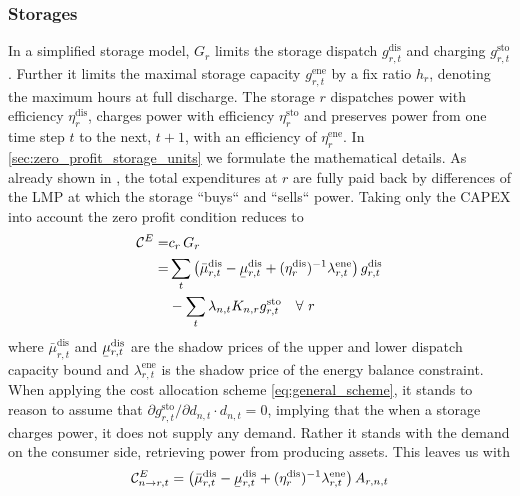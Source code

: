 \documentclass[11pt,twocolumn]{article}
\newcommand{\ubar}[1]{\underaccent{\bar}{#1}}
\newcommand{\Forall}[1]{\hspace{10pt} \forall \,\, #1 }
\newcommand{\storage}{g_{r,t}}
\newcommand{\storagedispatch}{\storage^\text{dis}}
\newcommand{\storagecharge}{\storage^\text{sto}}
\newcommand{\storagesoc}{\storage^\text{ene}}
\newcommand{\efficiency}{\eta_{r}}
\newcommand{\efficiencydispatch}{\efficiency^\text{dis}}
\newcommand{\efficiencycharge}{\efficiency^\text{sto}}
\newcommand{\efficiencysoc}{\efficiency^\text{ene}}
\newcommand{\capitalpricestorage}{c_r}
\newcommand{\capacitystorage}{G_r}
\newcommand{\mulowerstoragedispatch}{\ubar{\mu}_{r,t}^\text{dis}}
\newcommand{\muupperstoragedispatch}{\bar{\mu}_{r,t}^\text{dis}}
\newcommand{\muupperstoragecharge}{\bar{\mu}_{r,t}^\text{sto}}
\newcommand{\muupperstoragesoc}{\bar{\mu}_{r,t}^\text{ene}}
\newcommand{\mustateofcharge}{\lambda^\text{ene}_{r,t}}
\newcommand{\lmp}[1][n]{\lambda_{#1,t}}
\newcommand{\demand}[1][n]{d_{#1,t}}
\newcommand{\incidencestorage}[1][n]{K_{#1,r}}
\newcommand{\capexstorage}{\mathcal{C}^E}
\newcommand{\allocatestoragedispatch}[1][r, n]{A_{#1,t}}
\newcommand{\allocatecapexstorage}[1][n \rightarrow r]{\capexstorage_{#1,t}}
\begin{document}
\subsubsection{Storages}


In a simplified storage model, $\capacitystorage$ limits the storage dispatch $\storagedispatch$ and charging $\storagecharge$. Further it limits the maximal storage capacity $\storagesoc$ by a fix ratio $h_r$, denoting the maximum hours at full discharge. The storage $r$ dispatches power with efficiency $\efficiencydispatch$, charges power with efficiency $\efficiencycharge$ and preserves power from one time step $t$ to the next, $t+1$, with an efficiency of $\efficiencysoc$. In \cref{sec:zero_profit_storage_units} we formulate the mathematical details. As already shown in \cite{brown_decreasing_2020}, the total expenditures at $r$ are fully paid back by differences of the LMP at which the storage ``buys`` and ``sells`` power. Taking only the CAPEX into account the zero profit condition reduces to
\begin{align}
    \notag
    \capexstorage =& \capitalpricestorage \, \capacitystorage \\
    \notag
    =& \sum_t \left(\muupperstoragedispatch - \mulowerstoragedispatch  + (\efficiencydispatch )^{-1} \mustateofcharge \right) \storagedispatch \\
    &- \sum_t \lmp \incidencestorage  \storagecharge \Forall{r} 
    \label{eq:no_profit_capex_storage}
\end{align}
where $\muupperstoragedispatch$ and $\mulowerstoragedispatch$ are the shadow prices of the upper and lower dispatch capacity bound and $\mustateofcharge$ is the shadow price of the energy balance constraint. When applying the cost allocation scheme \cref{eq:general_scheme}, it stands to reason to assume that $\partial \storagecharge / \partial \demand \cdot \demand = 0$, implying that the when a storage charges power, it does not supply any demand. Rather it stands with the demand on the consumer side, retrieving power from producing assets. 
This leaves us with 
\begin{align}
     \allocatecapexstorage = \left(\muupperstoragedispatch - \mulowerstoragedispatch  + (\efficiencydispatch )^{-1} \mustateofcharge \right) \allocatestoragedispatch
\end{align}
\end{document}
